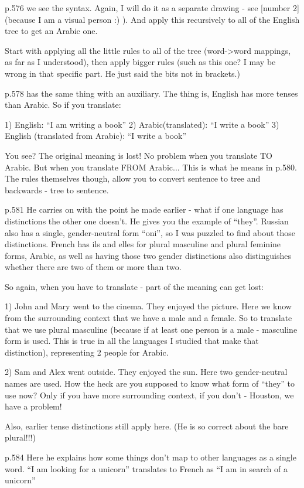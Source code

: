 p.576 we see the syntax. Again, I will do it as a separate drawing - see [number
2] (because I am a visual person :) ). And apply this recursively to all of the
English tree to get an Arabic one.

Start with applying all the little rules to all of the tree (word->word
mappings, as far as I understood), then apply bigger rules (such as this one? I
may be wrong in that specific part. He just said the bits not in brackets.)

p.578 has the same thing with an auxiliary. The thing is, English has more tenses
than Arabic. So if you translate:

1) English: ``I am writing a book''
2) Arabic(translated): ``I write a book''
3) English (translated from Arabic): ``I write a book''

You see? The original meaning is lost! No problem when you translate TO Arabic.
But when you translate FROM Arabic... This is what he means in  p.580. The rules
themselves though, allow you to convert sentence to tree and backwards - tree to
sentence.

p.581 He carries on with the point he made earlier - what if one language has
distinctions the other one doesn't. He gives you the example of ``they''.
Russian also has a single, gender-neutral form ``oni'', so I was puzzled to find
about those distinctions. French has ils and elles for plural masculine and
plural feminine forms, Arabic, as well as having those two gender distinctions
also distinguishes whether there are two of them or more than two.

So again, when you have to translate - part of the meaning can get lost:

1) John and Mary went to the cinema. They enjoyed the picture. Here we know from
the surrounding context that we have a male and a female. So to translate that
we use plural masculine (because if at least one person is a male - masculine
form is used. This is true in all the languages I studied that make that
distinction), representing 2 people for Arabic.

2) Sam and Alex went outside. They enjoyed the sun. Here two gender-neutral
names are used. How the heck are you supposed to know what form of ``they'' to
use now? Only if you have more surrounding context, if you don't - Houston, we
have a problem!

Also, earlier tense distinctions still apply here.
(He is so correct about the bare plural!!!)

p.584 Here he explains how some things don't map to other languages as a single
word. ``I am looking for a unicorn'' translates to French as ``I am in search of
a unicorn''


